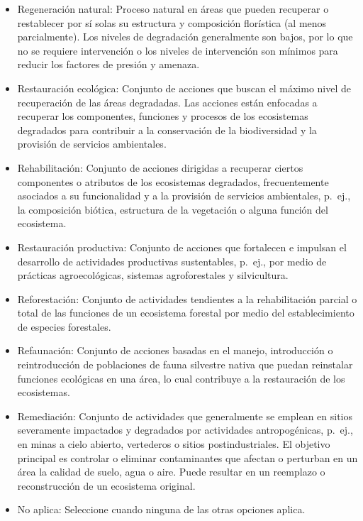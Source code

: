 \documentclass[
]{book}
\providecommand{\tightlist}{%
  \setlength{\itemsep}{0pt}\setlength{\parskip}{0pt}}
\begin{document}
\begin{itemize}
\tightlist
\item
  Regeneración natural: Proceso natural en áreas que pueden recuperar o restablecer por sí solas su estructura y composición florística (al menos parcialmente).
  Los niveles de degradación generalmente son bajos, por lo que no se requiere intervención o los niveles de intervención son mínimos para reducir los factores de presión y amenaza.
\item
  Restauración ecológica: Conjunto de acciones que buscan el máximo nivel de recuperación de las áreas degradadas.
  Las acciones están enfocadas a recuperar los componentes, funciones y procesos de los ecosistemas degradados para contribuir a la conservación de la biodiversidad y la provisión de servicios ambientales.
\item
  Rehabilitación: Conjunto de acciones dirigidas a recuperar ciertos componentes o atributos de los ecosistemas degradados, frecuentemente asociados a su funcionalidad y a la provisión de servicios ambientales, p.~ej., la composición biótica, estructura de la vegetación o alguna función del ecosistema.
\item
  Restauración productiva: Conjunto de acciones que fortalecen e impulsan el desarrollo de actividades productivas sustentables, p.~ej., por medio de prácticas agroecológicas, sistemas agroforestales y silvicultura.
\item
  Reforestación: Conjunto de actividades tendientes a la rehabilitación parcial o total de las funciones de un ecosistema forestal por medio del establecimiento de especies forestales.
\item
  Refaunación: Conjunto de acciones basadas en el manejo, introducción o reintroducción de poblaciones de fauna silvestre nativa que puedan reinstalar funciones ecológicas en una área, lo cual contribuye a la restauración de los ecosistemas.
\item
  Remediación: Conjunto de actividades que generalmente se emplean en sitios severamente impactados y degradados por actividades antropogénicas, p.~ej., en minas a cielo abierto, vertederos o sitios postindustriales.
  El objetivo principal es controlar o eliminar contaminantes que afectan o perturban en un área la calidad de suelo, agua o aire. Puede resultar en un reemplazo o reconstrucción de un ecosistema original.
\item
  No aplica: Seleccione cuando ninguna de las otras opciones aplica.
\end{itemize}
\end{document}
